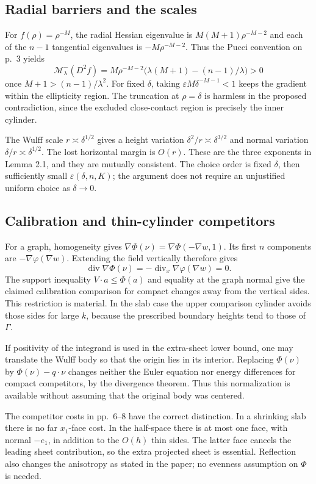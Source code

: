 \documentclass[10pt]{article}
\begin{document}
\subsection*{Radial barriers and the scales}
For \(f(\rho)=\rho^{-M}\), the radial Hessian eigenvalue is \(M(M+1)\rho^{-M-2}\) and each of the \(n-1\) tangential eigenvalues is \(-M\rho^{-M-2}\). Thus the Pucci convention on p. 3 yields \[\mathcal M^-_\lambda(D^2f)
  =M\rho^{-M-2}
       \bigl(\lambda(M+1)-(n-1)/\lambda\bigr)>0\] once \(M+1>(n-1)/\lambda^2\). For fixed \(\delta\), taking \(\varepsilon M\delta^{-M-1}<1\) keeps the gradient within the ellipticity region. The truncation at \(\rho=\delta\) is harmless in the proposed contradiction, since the excluded close-contact region is precisely the inner cylinder.\par
The Wulff scale \(r\asymp\delta^{1/2}\) gives a height variation \(\delta^2/r\asymp\delta^{3/2}\) and normal variation \(\delta/r\asymp\delta^{1/2}\). The lost horizontal margin is \(O(r)\). These are the three exponents in Lemma 2.1, and they are mutually consistent. The choice order is fixed \(\delta\), then sufficiently small \(\varepsilon(\delta,n,K)\); the argument does not require an unjustified uniform choice as \(\delta\to0\).\par
\subsection*{Calibration and thin-cylinder competitors}
For a graph, homogeneity gives \(\nabla\Phi(\nu)=\nabla\Phi(-\nabla w,1)\). Its first \(n\) components are \(-\nabla\varphi(\nabla w)\). Extending the field vertically therefore gives \[\operatorname{div}\nabla\Phi(\nu)
     =-\operatorname{div}_x\nabla\varphi(\nabla w)=0.\] The support inequality \(V\cdot a\le\Phi(a)\) and equality at the graph normal give the claimed calibration comparison for compact changes away from the vertical sides. This restriction is material. In the slab case the upper comparison cylinder avoids those sides for large \(k\), because the prescribed boundary heights tend to those of \(\Gamma\).\par
If positivity of the integrand is used in the extra-sheet lower bound, one may translate the Wulff body so that the origin lies in its interior. Replacing \(\Phi(\nu)\) by \(\Phi(\nu)-q\cdot\nu\) changes neither the Euler equation nor energy differences for compact competitors, by the divergence theorem. Thus this normalization is available without assuming that the original body was centered.\par
The competitor costs in pp. 6–8 have the correct distinction. In a shrinking slab there is no far \(x_1\)-face cost. In the half-space there is at most one face, with normal \(-e_1\), in addition to the \(O(h)\) thin sides. The latter face cancels the leading sheet contribution, so the extra projected sheet is essential. Reflection also changes the anisotropy as stated in the paper; no evenness assumption on \(\Phi\) is needed.\par
\end{document}
